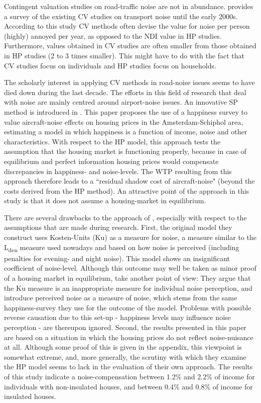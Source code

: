 \documentclass[a4paper]{scrartcl}
\begin{document}
Contingent valuation studies on road-traffic noise are not in abundance. \cite{Navrud2002} provides a survey of the existing CV studies on transport noise until the early 2000s. According to this study CV methods often devise the value for noise per person (highly) annoyed per year, as opposed to the NDI value in HP studies. Furthermore, values obtained in CV studies are often smaller from those obtained in HP studies (2 to 3 times smaller). This might have to do with the fact that CV studies focus on individuals and HP studies focus on households. 

The scholarly interest in applying CV methods in road-noise issues seems to have died down during the last decade. The efforts in this field of research that deal with noise are mainly centred around airport-noise issues. An innovative SP method is introduced in \cite{VanPraag2005}. This paper proposes the use of a happiness survey to value aircraft-noise effects on housing prices in the Amsterdam-Schiphol area, estimating a model in which happiness is a function of income, noise and other characteristics. With respect to the HP model, this approach tests the assumption that the housing market is functioning properly, because in case of equilibrium and perfect information housing prices would compensate discrepancies in happiness- and noise-levels. The WTP resulting from this approach therefore leads to a ``residual shadow cost of aircraft-noise" (beyond the costs derived from the HP method). An attractive point of the approach in this study is that it does not assume a housing-market in equilibrium.

There are several drawbacks to the approach of \cite{VanPraag2005}, especially with respect to the assumptions that are made during research. First, the original model they construct uses Kosten-Units (Ku) as a measure for noise, a measure similar to the L\textsubscript{den} measure used nowadays and based on how noise is perceived (including penalties for evening- and night noise). This model shows an insignificant coefficient of noise-level. Although this outcome may well be taken as minor proof of a housing market in equilibrium, \cite{VanPraag2005} take another point of view: They argue that the Ku measure is an inappropriate measure for individual noise perception, and introduce perceived noise as a measure of noise, which stems from the same happiness-survey they use for the outcome of the model. Problems with possible reverse causation due to this set-up - happiness levels may influence noise perception - are thereupon ignored. Second, the results presented in this paper are based on a situation in which the housing prices do not reflect noise-nuisance at all. Although some proof of this is given in the appendix, this viewpoint is somewhat extreme, and, more generally, the scrutiny with which they examine the HP model seems to lack in the evaluation of their own approach. The results of this study indicate a noise-compensation between 1.2\% and 2.2\% of income for individuals with non-insulated houses, and between 0.4\% and 0.8\% of income for insulated houses.
\end{document}
